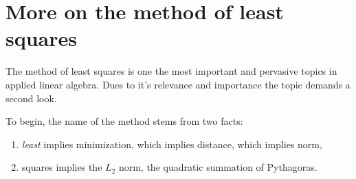 \chapter[Least squares]{More on the method of least squares}
The method of least squares is one the most important and pervasive topics in applied linear algebra. Dues to it's relevance and importance the topic demands a second look.

To begin, the name of the method stems from two facts:
\begin{enumerate}
\item \textit{least} implies minimization, which implies distance, which implies norm,
\item {squares} implies the $L_{2}$ norm, the quadratic summation of Pythagoras.
\end{enumerate}









\endinput